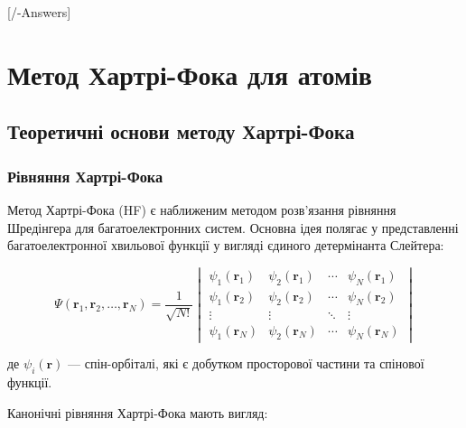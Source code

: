 
[\currfilebase/\currfilebase-Answers]
\chapter{Метод Хартрі-Фока для атомів}\label{\currfilebase}

\section{Теоретичні основи методу Хартрі-Фока}

\subsection{Рівняння Хартрі-Фока}

Метод Хартрі-Фока (HF) є наближеним методом розв'язання рівняння Шредінгера для багатоелектронних систем. Основна ідея полягає у представленні багатоелектронної хвильової функції у вигляді єдиного детермінанта Слейтера:

\begin{equation}
    \Psi(\mathbf{r}_1, \mathbf{r}_2, \ldots, \mathbf{r}_N) = \frac{1}{\sqrt{N!}}
    \begin{vmatrix}
        \psi_1(\mathbf{r}_1) & \psi_2(\mathbf{r}_1) & \cdots & \psi_N(\mathbf{r}_1) \\
        \psi_1(\mathbf{r}_2) & \psi_2(\mathbf{r}_2) & \cdots & \psi_N(\mathbf{r}_2) \\
        \vdots               & \vdots               & \ddots & \vdots               \\
        \psi_1(\mathbf{r}_N) & \psi_2(\mathbf{r}_N) & \cdots & \psi_N(\mathbf{r}_N)
    \end{vmatrix}
\end{equation}

де $\psi_i(\mathbf{r})$ --- спін-орбіталі, які є добутком просторової частини та спінової функції.

Канонічні рівняння Хартрі-Фока мають вигляд:

